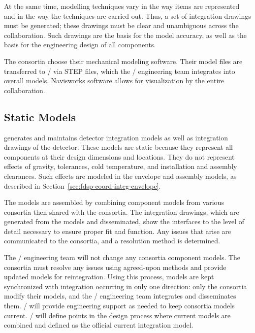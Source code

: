 At the same time, \threed modelling techniques vary in the way items are
represented and in the way the techniques are carried out. Thus, a set
of \twod integration drawings must be generated; these drawings must be
clear and unambiguous across the collaboration. Such \twod drawings are
the basis for the \threed model accuracy, as well as the basis for the engineering
design of all components.

The consortia choose their mechanical modeling software.
Their model files are transferred to / via STEP
files, which the / engineering team integrates
into overall models.  Navisworks software allows for visualization by
the entire collaboration.

\subsection{Static Models}
\label{sec:fdsp-coord-integ-static}

 generates and maintains \threed detector integration models
as well as \twod integration drawings of the detector. These models
are static because they represent all components at their design
dimensions and locations. They do not represent effects of gravity,
tolerances, cold temperature, and installation and assembly
clearances. Such effects are modeled in the envelope and assembly
models, as described in Section~\ref{sec:fdsp-coord-integ-envelope}.


The \threed models are assembled by combining component models from
various consortia  then shared with the consortia. The \twod
integration drawings, which are generated from the \threed models and
disseminated, show the interfaces to the level of detail necessary to
ensure proper fit and function. Any issues that arise are communicated
to the consortia, and a resolution method is determined.

The / engineering team will not change any
consortia component models.  The consortia must resolve any issues
using agreed-upon methods  and provide updated models for
reintegration. Using this process, models are kept synchronized with
integration occurring in only one direction: only the consortia modify
their models, and the / engineering team
integrates and disseminates them.  / will provide
engineering support as needed to keep consortia models
current. / will define points in the design
process where current models are combined and defined as the official
current integration model.

